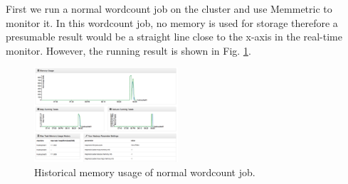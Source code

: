 First we run a normal wordcount job on the cluster and use Memmetric to monitor it. In this wordcount job, no memory is used for storage therefore a presumable result would be a straight line close to the x-axis in the real-time monitor. However, the running result is shown in Fig. \ref{ref:baseline.png}.
\begin{figure}[ht]
  \centering
    \includegraphics[width=2.1in]{image/baseline.png}
    \caption{Historical memory usage of normal wordcount job.}
    \label{ref:baseline.png}
\end{figure}